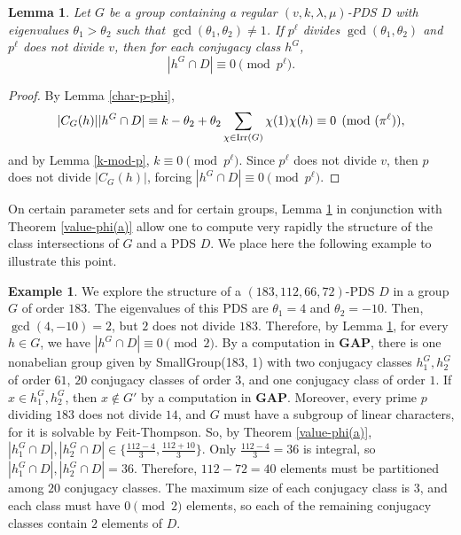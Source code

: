 \documentclass[12pt]{amsproc} %
\newtheorem{lem}[thm]{Lemma}
\theoremstyle{definition}\newtheorem{defn}[thm]{Definition}
\theoremstyle{definition}\newtheorem{rem}[thm]{Remark}
\theoremstyle{definition}\newtheorem{ex}[thm]{Example}
\newcommand{\Irr}{{\rm Irr}}
\newcommand{\GAP}{\textbf{{\rm GAP}}}
\begin{document}
\begin{lem}\label{shared-prime-class-intersection}
Let $G$ be a group containing a regular $(v, k, \lambda, \mu)$-PDS $D$ with eigenvalues $\theta_1 > \theta_2$ such that $\gcd(\theta_1, \theta_2) \neq 1$. If $p^\ell$ divides $\gcd(\theta_1, \theta_2)$ and $p^\ell$ does not divide $v$, then for each conjugacy class $h^G$, \[|h^G \cap D| \equiv 0 \pmod{p^\ell}.\]
\end{lem}
	\begin{proof}
	By Lemma \ref{char-p-phi}, \[|C_G(h)||h^G\cap D| \equiv k - \theta_2 + \theta_2\sum_{\chi\in\Irr(G)}\chi(1)\chi(h) \equiv 0 \pmod {(\pi^\ell)},\] and by Lemma \ref{k-mod-p}, $k \equiv 0 \pmod{p^\ell}$. Since $p^\ell$ does not divide $v$, then $p$ does not divide $|C_G(h)|$, forcing $|h^G\cap D| \equiv 0 \pmod{p^\ell}$.
	\end{proof}
	
On certain parameter sets and for certain groups, Lemma \ref{shared-prime-class-intersection} in conjunction with Theorem \ref{value-phi(a)} allow one to compute very rapidly the structure of the class intersections of $G$ and a PDS $D$. We place here the following example to illustrate this point.

\begin{ex}
	We explore the structure of a $(183, 112, 66, 72)$-PDS $D$ in a group $G$ of order $183$. The eigenvalues of this PDS are $\theta_1 = 4$ and $\theta_2 = -10$. Then, $\gcd(4, -10) = 2$, but $2$ does not divide $183$. Therefore, by Lemma \ref{shared-prime-class-intersection}, for every $h \in G$, we have $|h^G \cap D| \equiv 0 \pmod 2$. By a computation in \GAP \cite{GAP4}, there is one nonabelian group given by SmallGroup(183, 1) with two conjugacy classes $h_1^G, h_2^G$ of order $61$, $20$ conjugacy classes of order $3$, and one conjugacy class of order $1$. If $x \in h_1^G, h_2^G$, then $x \not \in G'$ by a computation in \GAP \cite{GAP4}. Moreover, every prime $p$ dividing $183$ does not divide $14$, and $G$ must have a subgroup of linear characters, for it is solvable by Feit-Thompson. So, by Theorem \ref{value-phi(a)}, $|h_1^G \cap D|, |h_2^G \cap D| \in \{\frac{112-4}{3}, \frac{112+10}{3}\}$. Only $\frac{112-4}{3} = 36$ is integral, so $|h_1^G \cap D|, |h_2^G \cap D| = 36$. Therefore, $112-72 = 40$ elements must be partitioned among $20$ conjugacy classes. The maximum size of each conjugacy class is $3$, and each class must have $0 \pmod 2$ elements, so each of the remaining conjugacy classes contain $2$ elements of $D$.
\end{ex}
\end{document}
